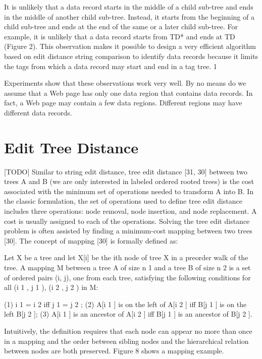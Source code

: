 It is unlikely that a data record starts in the middle of a child
sub-tree and ends in the middle of another child sub-tree.
Instead, it starts from the beginning of a child sub-tree and
ends at the end of the same or a later child sub-tree. For
example, it is unlikely that a data record starts from TD* and
ends at TD (Figure 2). This observation makes it possible to
design a very efficient algorithm based on edit distance string
comparison to identify data records because it limits the tags
from which a data record may start and end in a tag tree. 1

Experiments show that these observations work very well. By no
means do we assume that a Web page has only one data region
that contains data records. In fact, a Web page may contain a few
data regions. Different regions may have different data records.

\section{Edit Tree Distance}


[TODO] Similar to string edit distance, tree edit distance [31, 30] between
two trees A and B (we are only interested in labeled ordered
rooted trees) is the cost associated with the minimum set of
operations needed to transform A into B. In the classic
formulation, the set of operations used to define tree edit distance
includes three operations: node removal, node insertion, and node
replacement. A cost is usually assigned to each of the operations.
Solving the tree edit distance problem is often assisted by finding
a minimum-cost mapping between two trees [30]. The concept of
mapping [30] is formally defined as:

Let X be a tree and let X[i] be the ith node of tree X in a preorder
walk of the tree. A mapping M between a tree A of size n 1 and a
tree B of size n 2 is a set of ordered pairs (i, j), one from each tree,
satisfying the following conditions for all (i 1 , j 1 ), (i 2 , j 2 ) in M:

(1) i 1 = i 2 iff j 1 = j 2 ;
(2) A[i 1 ] is on the left of A[i 2 ] iff B[j 1 ] is on the left B[j 2 ];
(3) A[i 1 ] is an ancestor of A[i 2 ] iff B[j 1 ] is an ancestor of B[j 2 ].

Intuitively, the definition requires that each node can appear no
more than once in a mapping and the order between sibling nodes
and the hierarchical relation between nodes are both preserved.
Figure 8 shows a mapping example.


